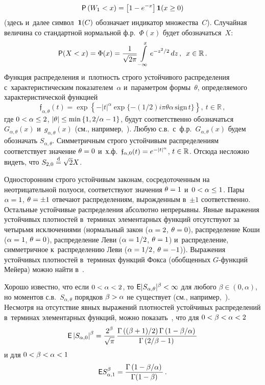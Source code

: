 \begin{multicols}{2}
\noindent
$$
{\sf P}\left(W_1\hm<x\right)=\left[1\hm-e^{-x}\right]
{\bf 1}(x\hm\ge0)
$$ 
(здесь и~далее символ~${\bf 1}(C)$ обозначает индикатор
множества~$C$). Случайная величина со стандартной нормальной ф.р.~$\Phi(x)$
будет обозначаться~$X$:
$$
{\sf P}(X<x)=\Phi(x)=\displaystyle\frac{\displaystyle 1\mathstrut}{\displaystyle \sqrt{2\pi}\mathstrut}\int\limits_{-\infty}^{x}e^{-z^2/2}\,dz\,,
\enskip x\in\mathbb{R}\,.
$$
Функция распределения 
и~плот\-ность строго устойчивого распределения
с~характеристическим показателем~$\alpha$ и~параметром формы~$\theta$, 
определяемого характеристической функцией 
$$
\mathfrak{f}_{\alpha,\theta}(t)=
\exp\left\{-|t|^{\alpha}\exp\{-(1/2)i\pi\theta\alpha\,\mathrm{sign}\,t\}\right\},\
t\in\mathbb{R}\,,
$$
 где $0\hm<\alpha\hm\le2$,
$|\theta|\hm\le\min\left\{1,{2}/{\alpha}\hm-1\right\}$, будут
соответственно обозначаться $G_{\alpha,\theta}(x)$ 
и~$g_{\alpha,\theta}(x)$ (см., например,~\cite{Zolotarev1983}). Любую
с.в.\ с~ф.р.\ $G_{\alpha,\theta}(x)$ будем обозначать
$S_{\alpha,\theta}$. Симметричным строго устойчивым распределениям
соответствует значение $\theta\hm=0$ и~х.ф.~$\mathfrak{f}_{\alpha,0}(t)
\hm=e^{-|t|^{\alpha}}$, $t\hm\in\mathbb{R}$. Отсюда
несложно видеть, что $S_{2,0}\hm\eqd\sqrt{2}X$.

Односторонним строго устойчивым законам, сосредоточенным на
неотрицательной полуоси, соответствуют значения $\theta\hm=1$ 
и~$0\hm<\alpha\hm\le1$. Пары $\alpha\hm=1$, $\theta\hm=\pm1$ отвечают
распределениям, вы\-рож\-ден\-ным в~$\pm1$ соответственно. Остальные
устойчивые распределения абсолютно непрерывны. Явные выражения
устойчивых плотностей в~терминах элементарных функций отсутствуют за
четырьмя исключениями (нормальный закон ($\alpha\hm=2$, $\theta\hm=0$),
распределение Коши ($\alpha\hm=1$, $\theta\hm=0$), распределение Леви
($\alpha\hm=1/2$, $\theta\hm=1$) и~распределение, симметричное 
к~распределению Леви ($\alpha\hm=1/2$, $\theta\hm=-1$)). Выражения
устойчивых плотностей в~терминах функций Фокса (обобщенных
$G$-функ\-ций Мейера) можно найти в~\cite{Schneider1986, UchaikinZolotarev1999}.

Хорошо известно, что если $0\hm<\alpha\hm<2$, то ${\sf E}
|S_{\alpha,\theta}|^{\beta}\hm<\infty$ для любого
$\beta\in(0,\alpha)$, но моментов с.в.~$S_{\alpha,\theta}$ порядков
$\beta\hm>\alpha$ не существует (см., например,~\cite{Zolotarev1983}).
Несмотря на отсутствие явных выражений плотностей устойчивых
распределений в~терминах элементарных функций, можно показать~\cite{KorolevWeibull2016}, 
что для $0\hm<\beta\hm<\alpha\hm<2$
\begin{equation}
{\sf E}\left\vert S_{\alpha,0}\right\vert^{\beta}=\displaystyle\frac{\displaystyle 2^{\beta}\mathstrut}{\displaystyle \sqrt{\pi}\mathstrut}\,
\displaystyle\frac{\displaystyle \Gamma\left(({\beta+1})/{2}\right)\Gamma\left(1-{\beta}/{\alpha}\right)\mathstrut}{\displaystyle \Gamma\left({2}/{\beta}-1\right)\mathstrut}
\label{e4-kgz}
\end{equation}
и для $0<\beta<\alpha\hm< 1$
\begin{equation}
{\sf E}S_{\alpha,1}^{\beta}=
\displaystyle\frac{\displaystyle \Gamma\left(1-{\beta}/{\alpha}\right)\mathstrut}{\displaystyle \Gamma(1-\beta)\mathstrut}\,.
\label{e5-kgz}
\end{equation}


\end{multicols}
